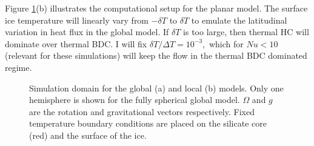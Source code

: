 \documentclass[12pt]{article}
\begin{document}
Figure \ref{f:plan}(b) illustrates the computational setup for the planar model. The surface ice temperature will linearly vary from $-\delta T$ to $\delta T$ to emulate the latitudinal variation in heat flux in the global model. If $\delta T$ is too large, then thermal HC will dominate over thermal BDC. I will fix $\delta T/\Delta T = 10^{-3},$ which for $Nu<10$ (relevant for these simulations) will keep the flow in the thermal BDC dominated regime\citep{cN22}.
\begin{figure}
	\begin{center}
	\end{center}
	\caption{Simulation domain for the global (a) and local (b) models. Only one hemisphere is shown for the fully spherical global model. $\Omega$ and $g$ are the rotation and gravitational vectors respectively. Fixed temperature boundary conditions are placed on the silicate core (red) and the surface of the ice.}
	\label{f:plan}
\end{figure}
\end{document}
